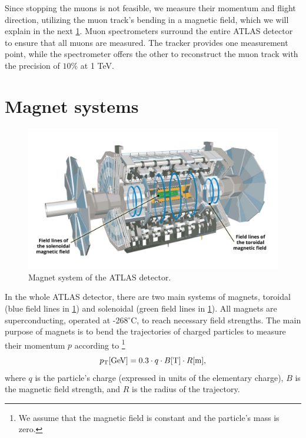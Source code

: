 Since stopping the muons is not feasible, we measure their momentum and flight direction, utilizing the muon track's bending in a magnetic field, which we will explain in the next \cref{sec:magnet}.
Muon spectrometers surround the entire ATLAS detector to ensure that all muons are measured.
The tracker provides one measurement point, while the spectrometer offers the other to reconstruct the muon track with the precision of $10\%$ at 1 TeV.


\section{Magnet systems}
\label{sec:magnet}
\begin{figure}[htb]
    \centering
    \includegraphics[width=1\linewidth]{src/img/magnet.jpg}
    \caption{Magnet system of the ATLAS detector.}
    \label{fig:magnet}
\end{figure}

In the whole ATLAS detector, there are two main systems of magnets, toroidal (blue field lines in \cref{fig:magnet}) and solenoidal (green field lines in \cref{fig:magnet}).
All magnets are superconducting, operated at -268$^\circ$C, to reach necessary field strengths.
The main purpose of magnets is to bend the trajectories of charged particles to measure their momentum $p$ according to \footnote{We assume that the magnetic field is constant and the particle's mass is zero.}
\begin{equation}
    \label{eq:magnet_momentum}
    p_\text{T} [\text{GeV}] = 0.3 \cdot q \cdot B [\text{T}] \cdot R [\text{m}],
\end{equation} 
where $q$ is the particle's charge (expressed in units of the elementary charge), $B$ is the magnetic field strength, and $R$ is the radius of the trajectory.

